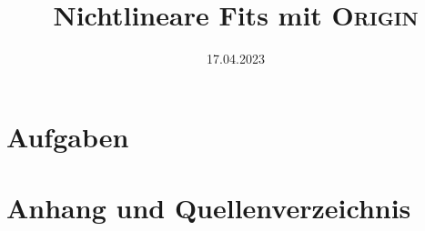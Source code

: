 
\title{Nichtlineare Fits mit \textsc{Origin}}
\date{17.04.2023}

    \maketitle
    \newpage
    
    
    \newpage
    \part{Aufgaben}
    
    \newpage
    
    
    \newpage
    \part{Anhang und Quellenverzeichnis}
    \printbibliography[heading=bibnumbered,title=Referenzen und Literatur]
    

